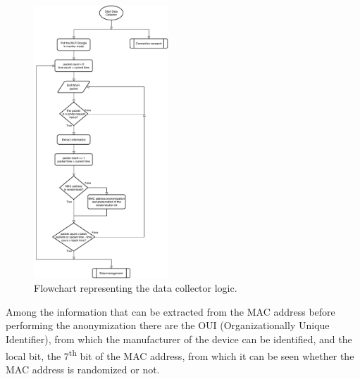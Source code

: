 \begin{figure}[h!]
\centering 
\includegraphics[width=0.45\textwidth]{images/flowcollect} 
\caption{Flowchart representing the data collector logic.}
\label{fig:flowcollect}
\end{figure}


Among the information that can be extracted from the MAC address before performing the anonymization there are the OUI (Organizationally Unique Identifier), from which the manufacturer of the device can be identified, and the local bit, the 7\textsuperscript{th} bit of the MAC address, from which it can be seen whether the MAC address is randomized or not.

